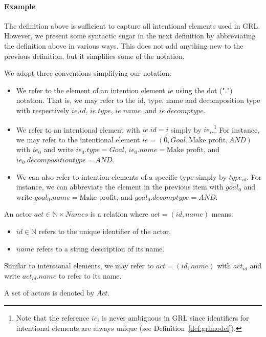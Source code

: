 \paragraph{Example} 

The definition above is sufficient to capture all intentional elements used in GRL. However, we present some syntactic sugar in the next definition by abbreviating the definition above in various ways. This does not add anything new to the previous definition, but it simplifies some of the notation.

\begin{definition}[Notation]
\label{def:notation}
We adopt three conventions simplifying our notation:
\begin{itemize}
\item
We refer to the element of an intention element $ie$ using the dot (".") notation. That is, we may refer to the id, type, name and decomposition type with respectively $ie.id$, $ie.type$, $ie.name$, and $ie.decomptype$.
\item 
We refer to an intentional element with $ie.id=i$ simply by $ie_i$.\footnote{Note that the reference $ie_i$ is never ambiguous in GRL since identifiers for intentional elements are always unique (see Definition~\ref{def:grlmodel}).} For instance, we may refer to the intentional element $ie = (0, Goal, \text{Make profit}, AND)$ with $ie_0$ and write $ie_0.type = Goal$, $ie_0.name = \text{Make profit}$, and $ie_0.decompositiontype = AND$. 
\item
We can also refer to intention elements of a specific type simply by $type_{id}$. For instance, we can abbreviate the element in the previous item with $goal_0$ and write $goal_0.name = \text{Make profit}$, and $goal_0.decomptype = AND$.
\end{itemize}
\end{definition}

\begin{definition}[Actor]
\label{def:actor}
An actor $act \in \mathbb{N}\times Names$ is a relation where $act=(id,name)$ means:
\begin{itemize}
\item $id\in\mathbb{N}$ refers to the unique identifier of the actor, 
\item $name$ refers to a string description of its name.
\end{itemize}

Similar to intentional elements, we may refer to $act = (id,name)$ with $act_{id}$ and write $act_{id}.name$ to refer to its name.

A set of actors is denoted by $Act$.
\end{definition}


